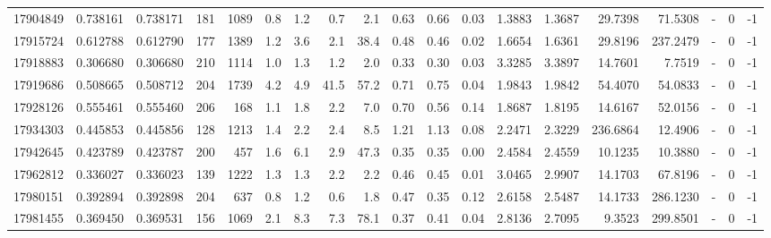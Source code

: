 \begin{tabular}{rrrrrrrrrrrrrrrrlrr}
  17904849 & 0.738161 &   0.738171 &  181 & 1089 &      0.8 &      1.2 &     0.7 &      2.1 &       0.63 &        0.66 &        0.03 &  1.3883 &  1.3687 &   29.7398 &   71.5308 &             - &        0 &         -1 \\
  17915724 & 0.612788 &   0.612790 &  177 & 1389 &      1.2 &      3.6 &     2.1 &     38.4 &       0.48 &        0.46 &        0.02 &  1.6654 &  1.6361 &   29.8196 &  237.2479 &             - &        0 &         -1 \\
  17918883 & 0.306680 &   0.306680 &  210 & 1114 &      1.0 &      1.3 &     1.2 &      2.0 &       0.33 &        0.30 &        0.03 &  3.3285 &  3.3897 &   14.7601 &    7.7519 &             - &        0 &         -1 \\
  17919686 & 0.508665 &   0.508712 &  204 & 1739 &      4.2 &      4.9 &    41.5 &     57.2 &       0.71 &        0.75 &        0.04 &  1.9843 &  1.9842 &   54.4070 &   54.0833 &             - &        0 &         -1 \\
  17928126 & 0.555461 &   0.555460 &  206 &  168 &      1.1 &      1.8 &     2.2 &      7.0 &       0.70 &        0.56 &        0.14 &  1.8687 &  1.8195 &   14.6167 &   52.0156 &             - &        0 &         -1 \\
  17934303 & 0.445853 &   0.445856 &  128 & 1213 &      1.4 &      2.2 &     2.4 &      8.5 &       1.21 &        1.13 &        0.08 &  2.2471 &  2.3229 &  236.6864 &   12.4906 &             - &        0 &         -1 \\
  17942645 & 0.423789 &   0.423787 &  200 &  457 &      1.6 &      6.1 &     2.9 &     47.3 &       0.35 &        0.35 &        0.00 &  2.4584 &  2.4559 &   10.1235 &   10.3880 &             - &        0 &         -1 \\
  17962812 & 0.336027 &   0.336023 &  139 & 1222 &      1.3 &      1.3 &     2.2 &      2.2 &       0.46 &        0.45 &        0.01 &  3.0465 &  2.9907 &   14.1703 &   67.8196 &             - &        0 &         -1 \\
  17980151 & 0.392894 &   0.392898 &  204 &  637 &      0.8 &      1.2 &     0.6 &      1.8 &       0.47 &        0.35 &        0.12 &  2.6158 &  2.5487 &   14.1733 &  286.1230 &             - &        0 &         -1 \\
  17981455 & 0.369450 &   0.369531 &  156 & 1069 &      2.1 &      8.3 &     7.3 &     78.1 &       0.37 &        0.41 &        0.04 &  2.8136 &  2.7095 &    9.3523 &  299.8501 &             - &        0 &         -1 \\

\end{tabular}
